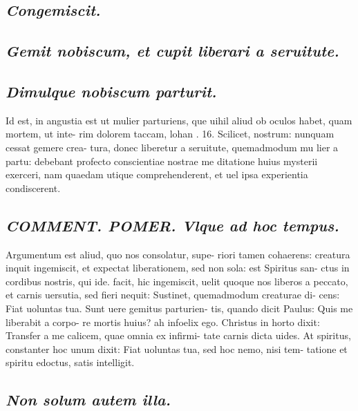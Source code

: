 \documentclass{article}
\begin{document}
\begin{pages}
\subsection*{\textit{Congemiscit. }}
{}
\subsection*{\textit{Gemit nobiscum, et cupit liberari a seruitute.  }}
{}
\subsection*{\textit{Dimulque nobiscum parturit. }}\pstart Id est, in angustia est ut mulier parturiens, que uihil aliud ob oculos habet, quam mortem, ut inte- rim dolorem taccam, lohan . 16.   \pend\pstart  \pend{} Scilicet, nostrum: nunquam cessat gemere crea- tura, donec liberetur a seruitute, quemadmodum mu lier a partu: debebant profecto conscientiae nostrae me ditatione huius mysterii exerceri, nam quaedam utique  comprehenderent, et uel ipsa experientia condiscerent.   \pend
{}
{}
\subsection*{\textit{\huge\textbf{COMMENT. POMER. }\normalsize Vlque ad hoc tempus. }}\pstart Argumentum est aliud, quo nos consolatur, supe- riori tamen cohaerens: creatura inquit ingemiscit, et expectat liberationem, sed non sola: est Spiritus san- ctus in cordibus nostris, qui ide. facit, hic ingemiscit, uelit quoque nos liberos a peccato, et carnis uersutia, sed fieri nequit: Sustinet, quemadmodum creaturae di- cens: Fiat uoluntas tua. Sunt uere gemitus parturien- tis, quando dicit Paulus: Quis me liberabit a corpo- re mortis huius? ah infoelix ego. Christus in horto dixit: Transfer a me calicem, quae omnia ex infirmi- tate carnis dicta uides. At spiritus, constanter hoc unum dixit: Fiat uoluntas tua, sed hoc nemo, nisi tem- tatione et spiritu edoctus, satis intelligit.  \pend
{}
{}
\subsection*{\textit{Non solum autem illa. }}
{}

\end{pages}
\end{document}

